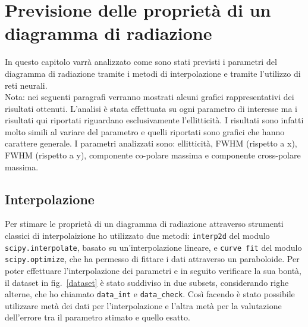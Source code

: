 \documentclass[12pt,a4paper,final]{book}
\begin{document}

\chapter{Previsione delle proprietà di un diagramma di radiazione}\label{prev_param}
In questo capitolo varrà analizzato come sono stati previsti i parametri del diagramma di radiazione tramite i metodi di interpolazione e tramite l'utilizzo di reti neurali. \\
Nota: nei seguenti paragrafi verranno mostrati alcuni grafici rappresentativi dei risultati ottenuti. L'analisi è stata effettuata su ogni parametro di interesse ma i risultati qui riportati riguardano esclusivamente l'ellitticità. I risultati sono infatti molto simili al variare del parametro e quelli riportati sono grafici che hanno carattere generale. I parametri analizzati sono: ellitticità, FWHM (rispetto a x), FWHM (rispetto a y), componente co-polare massima e componente cross-polare massima.


\section{Interpolazione}\label{interpolazione}
Per stimare le proprietà di un diagramma di radiazione attraverso strumenti classici di interpolaizione ho utilizzato due metodi: \texttt{interp2d} del modulo \texttt{scipy.interpolate}, basato su un'interpolazione lineare, e \texttt{curve fit} del modulo \texttt{scipy.optimize}, che ha permesso di fittare i dati attraverso un paraboloide.
Per poter effettuare l'interpolazione dei parametri e in seguito verificare la sua bontà, il dataset in fig.~\ref{dataset} è stato suddiviso in due subsets, considerando righe alterne, che ho chiamato \texttt{data\_int} e \texttt{data\_check}. Così facendo è stato possibile utilizzare metà dei dati per l'interpolazione e l'altra metà per la valutazione dell'errore tra il parametro stimato e quello esatto.

\end{document}
